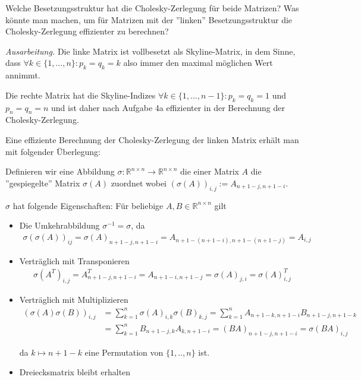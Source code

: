 \documentclass[]{article}
\newenvironment{ausarbeitung}{\vspace{3mm}\noindent\textit{Ausarbeitung.}}{}
\begin{document}
Welche Besetzungsstruktur hat die Cholesky-Zerlegung für beide Matrizen? Was könnte man machen, um für Matrizen mit der ''linken'' Besetzungsstruktur die Cholesky-Zerlegung effizienter zu berechnen?

\begin{ausarbeitung}
	Die linke Matrix ist vollbesetzt als Skyline-Matrix, in dem Sinne, dass $\forall k \in \{1, ..., n\}: p_k = q_k = k$ also immer den maximal möglichen Wert annimmt.
	
	Die rechte Matrix hat die Skyline-Indizes $\forall k \in \{1, ..., n - 1\}: p_k = q_k = 1$ und $p_n = q_n = n$ und ist daher nach Aufgabe 4a effizienter in der Berechnung der Cholesky-Zerlegung.
	
	Eine effiziente Berechnung der Cholesky-Zerlegung der linken Matrix erhält man mit folgender Überlegung:
	
	Definieren wir eine Abbildung $\sigma: \mathbb{R}^{n\times n} \rightarrow \mathbb{R}^{n \times n}$ die einer Matrix $A$ die ''gespiegelte'' Matrix $\sigma(A)$ zuordnet wobei $(\sigma(A))_{i,j} := A_{n+1-j, n+1-i}$.
	
	$\sigma$ hat folgende Eigenschaften: Für beliebige $A,B \in \mathbb{R}^{n \times n}$ gilt
	
	\begin{itemize}
		\item Die Umkehrabbildung $\sigma^{-1} = \sigma$, da
			\begin{align*}
				\sigma(\sigma(A))_{ij} = \sigma(A)_{n+1-j,n+1-i} = A_{n+1-(n+1-i),n+1-(n+1-j)} = A_{i,j}
			\end{align*}
		
		\item Verträglich mit Transponieren
			\begin{align*}
				\sigma(A^T)_{i,j} = A^T_{n+1-j,n+1-i} = A_{n+1-i,n+1-j} = \sigma(A)_{j,i} = \sigma(A)^T_{i,j}
			\end{align*}
		\item Verträglich mit Multiplizieren
			\begin{align*}
				(\sigma(A)\sigma(B))_{i,j} &= \sum_{k=1}^{n}\sigma(A)_{i,k}\sigma(B)_{k,j} = \sum_{k=1}^{n} A_{n+1-k,n+1-i}B_{n+1-j,n+1-k} \\
				&= \sum_{k=1}^{n} B_{n+1-j,k}A_{k,n+1-i} = (BA)_{n+1-j,n+1-i} = \sigma(BA)_{i,j}
			\end{align*}
		
			da $k \mapsto n+1-k$ eine Permutation von $\{1, .., n\}$ ist.
		\item Dreiecksmatrix bleibt erhalten
		

\end{itemize}
\end{ausarbeitung}
\end{document}
